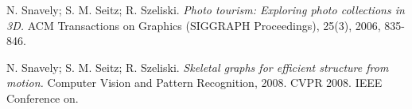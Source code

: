 \begin{thebibliography}{99}
  {\sc N. Snavely; S. M. Seitz; R. Szeliski.} 
  \emph{Photo tourism: Exploring photo collections in 3D.}
  ACM Transactions on Graphics (SIGGRAPH Proceedings), 25(3), 2006, 835-846.

  {\sc N. Snavely; S. M. Seitz; R. Szeliski.} 
  \emph{Skeletal graphs for efficient structure from motion.}
  Computer Vision and Pattern Recognition, 2008. CVPR 2008. IEEE Conference on.



\end{thebibliography}
